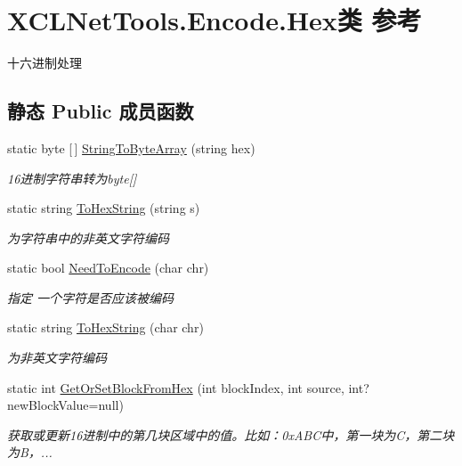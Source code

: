\hypertarget{class_x_c_l_net_tools_1_1_encode_1_1_hex}{}\section{X\+C\+L\+Net\+Tools.\+Encode.\+Hex类 参考}
\label{class_x_c_l_net_tools_1_1_encode_1_1_hex}


十六进制处理  


\subsection*{静态 Public 成员函数}
\begin{DoxyCompactItemize}
\item 
static byte \mbox{[}$\,$\mbox{]} \hyperlink{class_x_c_l_net_tools_1_1_encode_1_1_hex_a0fb06fdeea06d52883d1f1a93bfcf4e8}{String\+To\+Byte\+Array} (string hex)
\begin{DoxyCompactList}\small\item\em 16进制字符串转为byte\mbox{[}\mbox{]} \end{DoxyCompactList}\item 
static string \hyperlink{class_x_c_l_net_tools_1_1_encode_1_1_hex_a60f888006a88a296a97f8212abd0ddba}{To\+Hex\+String} (string s)
\begin{DoxyCompactList}\small\item\em 为字符串中的非英文字符编码 \end{DoxyCompactList}\item 
static bool \hyperlink{class_x_c_l_net_tools_1_1_encode_1_1_hex_aac3a2883c1182b43cdc0ebd7a5554895}{Need\+To\+Encode} (char chr)
\begin{DoxyCompactList}\small\item\em 指定 一个字符是否应该被编码 \end{DoxyCompactList}\item 
static string \hyperlink{class_x_c_l_net_tools_1_1_encode_1_1_hex_a58fb0c39fe4db08762c074d9d774729d}{To\+Hex\+String} (char chr)
\begin{DoxyCompactList}\small\item\em 为非英文字符编码 \end{DoxyCompactList}\item 
static int \hyperlink{class_x_c_l_net_tools_1_1_encode_1_1_hex_af9d8ed1d323ea38d664f56abf167878a}{Get\+Or\+Set\+Block\+From\+Hex} (int block\+Index, int source, int? new\+Block\+Value=null)
\begin{DoxyCompactList}\small\item\em 获取或更新16进制中的第几块区域中的值。比如：0x\+A\+B\+C中，第一块为\+C，第二块为\+B，... \end{DoxyCompactList}\end{DoxyCompactItemize}



